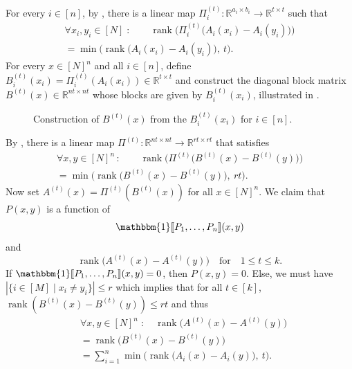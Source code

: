 \documentclass[conference]{IEEEtran}
\DeclareMathOperator{\rank}{rank}
\newcommand{\R}{\mathbb{R}}
\begin{document}
\begin{IEEEproof}
For every $i\in[n]$, by , there is a linear map $\Pi^{(t)}_i \colon \R^{a_i\times b_i}\to \R^{t \times t}$ such
that
\begin{align*}
    \forall x_i, y_i \in[N] \;\colon\qquad
        \rank\!\Big(\Pi^{(t)}_i\big(A_i(x_i)-A_i(y_i)\big)\Big)\\
        = \min\!\Big(\rank\!\big(A_i(x_i)-A_i(y_i)\big),\ t\Big).
\end{align*}
For every $x \in [N]^n$ and all $i\in [n]$, define $B^{(t)}_i(x_i) =
\Pi^{(t)}_i(A_i(x_i)) \in \R^{t\times t}$ and construct the diagonal block matrix $B^{(t)}(x)\in \R^{nt \times nt}$ whose blocks are given by $B^{(t)}_i(x_i)$, illustrated in .
\begin{figure}[t]
	\begin{center}
		
		\caption{Construction of $B^{(t)}(x)$ from the $B^{(t)}_i(x_i)$ for $i\in [n]$.}
		\label{fig:composition}
	\end{center}
\end{figure}
By , there is a linear map $\Pi^{(t)}\colon \R^{nt\times
nt}\to \R^{rt\times rt}$ that satisfies
\begin{align*}
	\forall x,y\in[N]^n\,\colon\qquad \rank\!\Big(\Pi^{(t)}\big(B^{(t)}(x)-B^{(t)}(y)\big)\Big)\\
    = \min\!\Big(\rank\!\big(B^{(t)}(x)-B^{(t)}(y)\big),\ rt \Big).
\end{align*}
Now set $A^{(t)}(x) = \Pi^{(t)}(B^{(t)}(x))$ for all $x\in [N]^n$. We claim that $P(x,y)$ is a function of
\[
	\mathbbm{1}\ldsbracket P_1, \dotsc, P_n \rdsbracket (x,y)
\]
and
\[
        \rank\big(A^{(t)}(x)-A^{(t)}(y)\big) \quad \text{for} \quad 1\leq t\leq k.
\]
If $\mathbbm{1}\ldsbracket P_1, \dotsc, P_n \rdsbracket (x,y) = 0$, then $P(x,y)
= 0$. Else, we must have $|\{i\in [M]\mid x_i\neq y_i\}| \leq r$ which implies
that for all $t \in [k]$, $\rank(B^{(t)}(x)-B^{(t)}(y)) \leq rt$ and thus
\begin{align*}
 &\forall x,y\in[N]^n \;\colon\quad \rank\!\Big(A^{(t)}(x)-A^{(t)}(y)\Big)\\
    &= \rank\!\Big(B^{(t)}(x)-B^{(t)}(y)\Big)\\
    &= \sum_{i = 1}^n \min\!\Big(\rank\!\big(A_i(x)-A_i(y)\big),\ t\Big).
\end{align*}


\end{IEEEproof}
\end{document}
